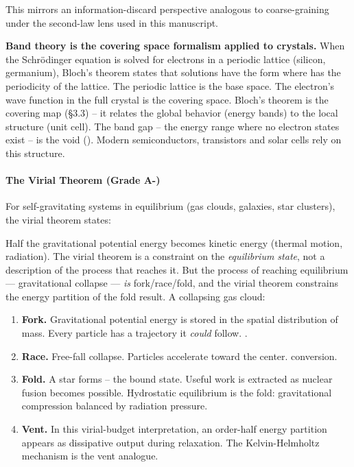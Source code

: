 \documentclass[
]{article}
\providecommand{\tightlist}{%
  \setlength{\itemsep}{0pt}\setlength{\parskip}{0pt}}
\begin{document}
This mirrors an information-discard perspective analogous to
coarse-graining under the second-law lens used in this manuscript.

\textbf{Band theory is the covering space formalism applied to
crystals.} When the Schrödinger equation is solved for electrons in a
periodic lattice (silicon, germanium), Bloch's theorem states that
solutions have the form where has the periodicity of the lattice. The
periodic lattice is the base space. The electron's wave function in the
full crystal is the covering space. Bloch's theorem is the covering map
(§3.3) -- it relates the global behavior (energy bands) to the local
structure (unit cell). The band gap -- the energy range where no
electron states exist -- is the void (). Modern semiconductors,
transistors and solar cells rely on this structure.

\paragraph{\texorpdfstring{\textbf{The Virial Theorem (Grade
A-)}}{The Virial Theorem (Grade A-)}}\label{the-virial-theorem-grade-a-}

For self-gravitating systems in equilibrium (gas clouds, galaxies, star
clusters), the virial theorem states:

Half the gravitational potential energy becomes kinetic energy (thermal
motion, radiation). The virial theorem is a constraint on the
\emph{equilibrium state}, not a description of the process that reaches
it. But the process of reaching equilibrium --- gravitational collapse
--- \emph{is} fork/race/fold, and the virial theorem constrains the
energy partition of the fold result. A collapsing gas cloud:

\begin{enumerate}
\def\labelenumi{\arabic{enumi}.}
\tightlist
\item
  \textbf{Fork.} Gravitational potential energy is stored in the spatial
  distribution of mass. Every particle has a trajectory it \emph{could}
  follow. .\\
\item
  \textbf{Race.} Free-fall collapse. Particles accelerate toward the
  center. conversion.\\
\item
  \textbf{Fold.} A star forms -- the bound state. Useful work is
  extracted as nuclear fusion becomes possible. Hydrostatic equilibrium
  is the fold: gravitational compression balanced by radiation
  pressure.\\
\item
  \textbf{Vent.} In this virial-budget interpretation, an order-half
  energy partition appears as dissipative output during relaxation. The
  Kelvin-Helmholtz mechanism is the vent analogue.
\end{enumerate}
\end{document}
